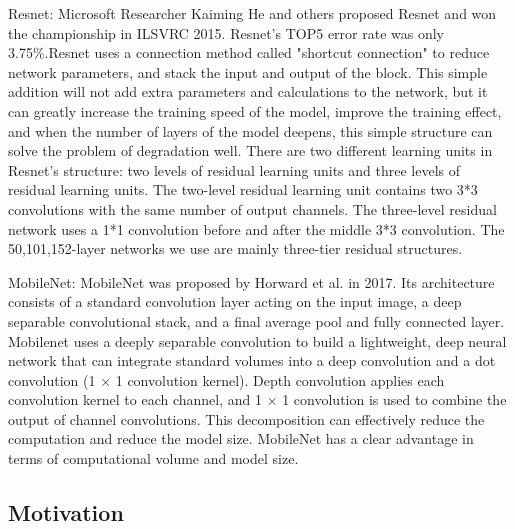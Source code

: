 Resnet: Microsoft Researcher Kaiming He and others proposed Resnet and won the championship in ILSVRC 2015. Resnet's TOP5 error rate was only 3.75\%.Resnet uses a connection method called "shortcut connection" to reduce network parameters, and stack the input and output of the block. This simple addition will not add extra parameters and calculations to the network, but it can greatly increase the training speed of the model, improve the training effect, and when the number of layers of the model deepens, this simple structure can solve the problem of degradation well. There are two different learning units in Resnet's structure: two levels of residual learning units and three levels of residual learning units. The two-level residual learning unit contains two 3*3 convolutions with the same number of output channels. The three-level residual network uses a 1*1 convolution before and after the middle 3*3 convolution. The 50,101,152-layer networks we use are mainly three-tier residual structures.


MobileNet: MobileNet was proposed by Horward et al. in 2017. Its architecture consists of a standard convolution layer acting on the input image, a deep separable convolutional stack, and a final average pool and fully connected layer. Mobilenet uses a deeply separable convolution to build a lightweight, deep neural network that can integrate standard volumes into a deep convolution and a dot convolution (1 × 1 convolution kernel). Depth convolution applies each convolution kernel to each channel, and 1 × 1 convolution is used to combine the output of channel convolutions. This decomposition can effectively reduce the computation and reduce the model size. MobileNet has a clear advantage in terms of computational volume and model size.

\subsection{Motivation}






